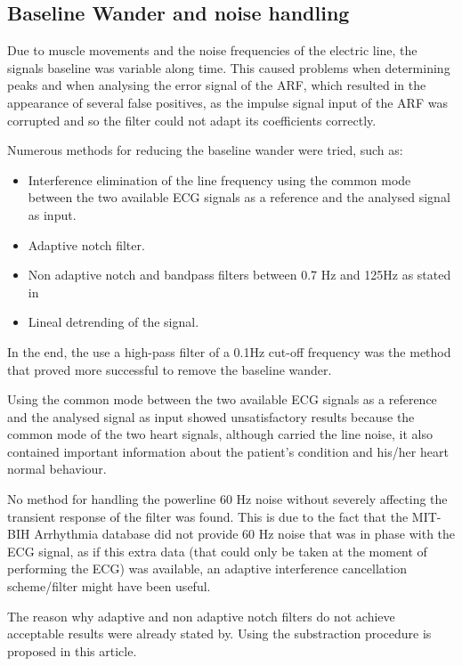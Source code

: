 \documentclass[conference]{IEEEtran}
\begin{document}
\subsection{Baseline Wander and noise handling}

Due to muscle movements and the noise frequencies of the electric line, the signals baseline was variable along time. This caused problems when determining peaks and when analysing the error signal of the ARF, which resulted in the appearance of several false positives, as the impulse signal input of the ARF was corrupted and so the filter could not adapt its coefficients correctly. \par
Numerous methods for reducing the baseline wander were tried, such as:
\begin{itemize}
\item Interference elimination of the line frequency using the common mode between the two available ECG signals as a reference and the analysed signal as input.
\item Adaptive notch filter.
\item Non adaptive notch and bandpass filters between 0.7 Hz and 125Hz as stated in \cite{b2}
\item Lineal detrending of the signal.
\end{itemize}

In the end, the use a high-pass filter of a 0.1Hz cut-off frequency was the method that proved more successful to remove the baseline wander.\par
Using the common mode between the two available ECG signals as a reference and the analysed signal as input showed unsatisfactory results because the common mode of the two heart signals, although carried the line noise, it also contained important information about the patient's condition and his/her heart normal behaviour.\par
No method for handling the powerline 60 Hz noise without severely affecting the transient response of the filter was found. This is due to the fact that the MIT-BIH Arrhythmia database did not provide 60 Hz noise that was in phase with the ECG signal, as if this extra data (that could only be taken at the moment of performing the ECG) was available, an adaptive interference cancellation scheme/filter might have been useful. \par
The reason why adaptive and non adaptive notch filters do not achieve acceptable results were already stated by. Using the substraction procedure is proposed in this article. \par
\end{document}

